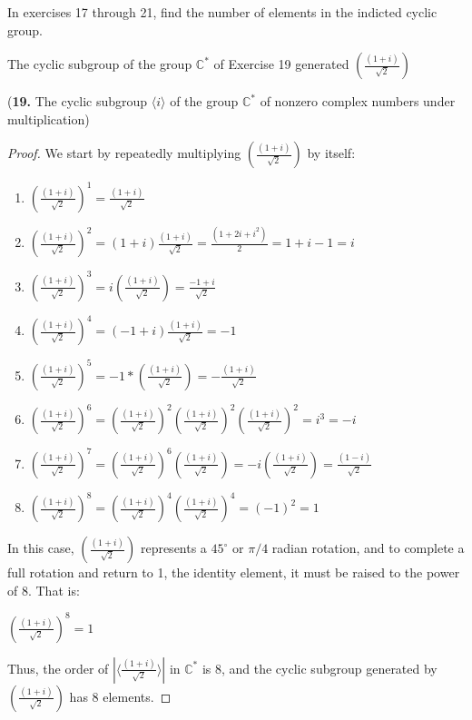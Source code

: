 \documentclass[12pt]{amsart}
\theoremstyle{definition}
\numberwithin{equation}{section}
\theoremstyle{plain}
\renewcommand{\C}{\mathbb{C}}
\begin{document}
    \begin{exercise}{20} In exercises 17 through 21, find the number of elements in the indicted cyclic group.

        The cyclic subgroup of the group $\C^*$ of Exercise 19 generated $(\frac{(1+i)}{\sqrt{2}} )$

        (\textbf{19.} The cyclic subgroup $\langle i \rangle$ of the group $\C^*$ of nonzero complex numbers under multiplication)
        \begin{proof}
        We start by repeatedly multiplying \((\frac{(1+i)}{\sqrt{2}} )\) by itself:
        
       \begin{enumerate}
        \item  \((\frac{(1+i)}{\sqrt{2}} )^1 = \frac{(1+i)}{\sqrt{2}} \)
        \item \((\frac{(1+i)}{\sqrt{2}} )^2 = (1+i)\frac{(1+i)}{\sqrt{2}} = \frac{(1+2i+i^2)}{2} = 1 + i - 1 = i\)
        \item \((\frac{(1+i)}{\sqrt{2}} )^3 = i(\frac{(1+i)}{\sqrt{2}} ) = \frac{-1 + i}{\sqrt{2}}\)
        \item\((\frac{(1+i)}{\sqrt{2}} )^4 = (-1 + i)\frac{(1+i)}{\sqrt{2}} = -1\)
        \item \((\frac{(1+i)}{\sqrt{2}} )^5 = -1*(\frac{(1+i)}{\sqrt{2}}) = -\frac{(1+i)}{\sqrt{2}}\)
        \item \((\frac{(1+i)}{\sqrt{2}} )^6 = (\frac{(1+i)}{\sqrt{2}} )^2(\frac{(1+i)}{\sqrt{2}} )^2(\frac{(1+i)}{\sqrt{2}} )^2 = i^3= -i\)
        \item \((\frac{(1+i)}{\sqrt{2}} )^7 = (\frac{(1+i)}{\sqrt{2}} )^6(\frac{(1+i)}{\sqrt{2}} ) = -i(\frac{(1+i)}{\sqrt{2}} )= \frac{(1-i)}{\sqrt{2}} \)
        \item \((\frac{(1+i)}{\sqrt{2}} )^8 = (\frac{(1+i)}{\sqrt{2}} )^4(\frac{(1+i)}{\sqrt{2}} )^4 = (-1)^2 = 1\)
       \end{enumerate}
        
        In this case, \((\frac{(1+i)}{\sqrt{2}} )\) represents a \(45^\circ\) or \(\pi/4\) radian rotation, and to complete a full rotation and return to 1, the identity element, it must be raised to the power of \(8\). 
        That is:
        
        \((\frac{(1+i)}{\sqrt{2}} )^8 = 1\)
        
        Thus, the order of \(|\langle\frac{(1+i)}{\sqrt{2}} \rangle|\) in \(\C^*\) is 8, and the cyclic subgroup generated by \((\frac{(1+i)}{\sqrt{2}} )\) has 8 elements.
        \end{proof}
    \end{exercise}
    
\end{document}
